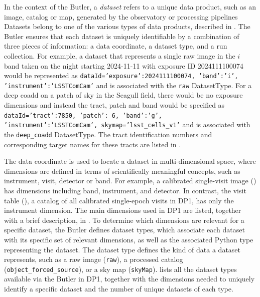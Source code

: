 In the context of the \gls{Butler}, a \emph{dataset} refers to a unique data product, such as an image, catalog or map, generated by the observatory or processing pipelines
Datasets belong to one of the various types of data products, described in .
The \gls{Butler} ensures that each dataset is uniquely identifiable by a combination of three pieces of information: a data coordinate, a dataset type, and a run collection.
For example, a dataset that represents a single raw image  in the $i$ band taken on the night starting 2024-11-11 with exposure ID 2024111100074 would be represented as
\texttt{dataId={'exposure':2024111100074, 'band':'i', 'instrument':'LSSTComCam'}} and is associated with the \texttt{raw} DatasetType.
For a deep coadd on a \gls{patch} of sky in the Seagull field, there would be no exposure dimensions and instead the tract, \gls{patch} and band would be specified as  \texttt{dataId={'tract':7850, 'patch': 6, 'band':'g', 'instrument':'LSSTComCam', skymap='lsst\_cells\_v1'}} and is associated with the \texttt{deep\_coadd} DatasetType.
The tract identification numbers and corresponding target names for these tracts are listed in .





The data coordinate is used to locate a dataset in multi-dimensional space, where dimensions are defined in terms of scientifically meaningful concepts, such as instrument, visit, detector or band.
For example, a calibrated single-visit image () has dimensions including band, instrument, and detector.
In contrast, the visit table (), a catalog of all calibrated single-epoch visits in \gls{DP1}, has only the instrument dimension.
The main dimensions used in \gls{DP1} are listed, together with a brief description, in .
To determine which dimensions are relevant for a specific dataset, the \gls{Butler} defines dataset types, which associate each dataset with its specific set of relevant dimensions, as well as the associated Python type representing the dataset.
The dataset type defines the kind of data a dataset represents, such as  a raw image  (\texttt{raw}), a processed catalog (\texttt{object\_forced\_source}), or a \gls{sky map} (\texttt{skyMap}).
 lists all the dataset types available via the Butler in \gls{DP1}, together with the dimensions needed to uniquely identify a specific dataset and the number of unique datasets of each type.

